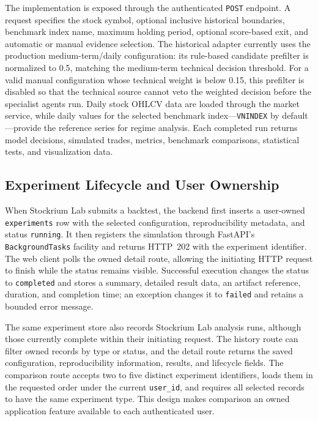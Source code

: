 The implementation is exposed through the authenticated \texttt{POST}  endpoint. A request specifies the stock symbol, optional inclusive historical boundaries, benchmark index name, maximum holding period, optional score-based exit, and automatic or manual evidence selection. The historical adapter currently uses the production medium-term/daily configuration: its rule-based candidate prefilter is normalized to 0.5, matching the medium-term technical decision threshold. For a valid manual configuration whose technical weight is below 0.15, this prefilter is disabled so that the technical source cannot veto the weighted decision before the specialist agents run. Daily stock OHLCV data are loaded through the market service, while daily values for the selected benchmark index---\texttt{VNINDEX} by default---provide the reference series for regime analysis. Each completed run returns model decisions, simulated trades, metrics, benchmark comparisons, statistical tests, and visualization data.

\subsection{Experiment Lifecycle and User Ownership}
\label{subsec:backtest-experiment-lifecycle}

When Stockrium Lab submits a backtest, the backend first inserts a user-owned \texttt{experiments} row with the selected configuration, reproducibility metadata, and status \texttt{running}. It then registers the simulation through FastAPI's \texttt{BackgroundTasks} facility and returns HTTP~202 with the experiment identifier. The web client polls the owned detail route, allowing the initiating HTTP request to finish while the status remains visible. Successful execution changes the status to \texttt{completed} and stores a summary, detailed result data, an artifact reference, duration, and completion time; an exception changes it to \texttt{failed} and retains a bounded error message.

The same experiment store also records Stockrium Lab analysis runs, although those currently complete within their initiating request. The history route can filter owned records by type or status, and the detail route returns the saved configuration, reproducibility information, results, and lifecycle fields. The comparison route accepts two to five distinct experiment identifiers, loads them in the requested order under the current \texttt{user\_id}, and requires all selected records to have the same experiment type. This design makes comparison an owned application feature available to each authenticated user.

